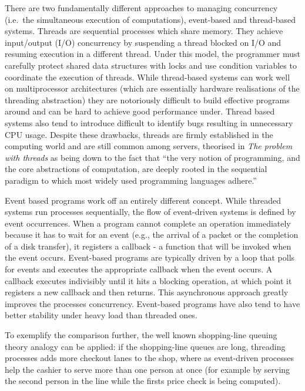    There are two fundamentally different approaches to managing concurrency (i.e.\ the simultaneous execution of computations), event-based and thread-based systems. Threads are sequential processes which share memory. They achieve input/output (I/O) concurrency by suspending a thread blocked on I/O and resuming execution in a different thread. Under this model, the programmer must carefully protect shared data structures with locks and use condition variables to coordinate the execution of threads\cite{dabek2002event}. While thread-based systems can work well on multiprocessor architectures (which are essentially hardware realisations of the threading abstraction) they are notoriously difficult to build effective programs around and can be hard to achieve good performance under\cite{JO}. Thread based systems also tend to introduce difficult to identify bugs resulting in unnecessary CPU usage\cite{mos02}. Despite these drawbacks, threads are firmly established in the computing world and are still common among servers, theorised in \textit{The problem with threads}\cite{lee2006problem} as being down to the fact that ``the very notion of programming, and the core abstractions of computation, are deeply rooted in the sequential paradigm to which most widely used programming languages adhere.''

    Event based programs work off an entirely different concept. While threaded systems run processes sequentially, the flow of event-driven systems is defined by event occurrences. When a program cannot complete an operation immediately because it has to wait for an event (e.g., the arrival of a packet or the completion of a disk transfer), it registers a callback - a function that will be invoked when the event occurs. Event-based programs are typically driven by a loop that polls for events and executes the appropriate callback when the event occurs. A callback executes indivisibly until it hits a blocking operation, at which point it registers a new callback and then returns.\cite{dabek2002event} This asynchronous approach greatly improves the processes concurrency. Event-based programs have also tend to have better stability under heavy load than threaded ones\cite{dabek2002event}.

    To exemplify the comparison further, the well known shopping-line queuing theory analogy can be applied: if the shopping-line queues are long, threading processes adds more checkout lanes to the shop, where as event-driven processes help the cashier to serve more than one person at once (for example by serving the second person in the line while the firsts price check is being computed).

